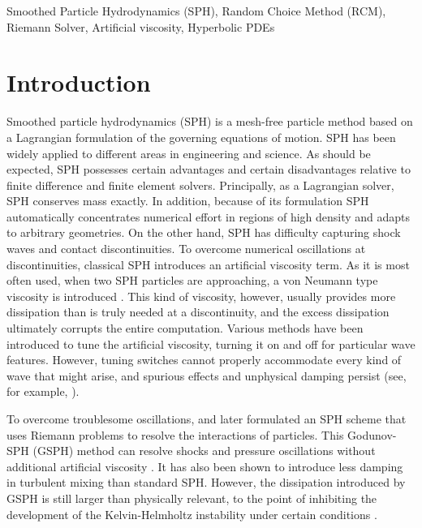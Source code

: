 \documentclass[review]{elsarticle}
\begin{document}
\begin{frontmatter}
\begin{abstract}
\end{abstract}
\begin{keyword}
Smoothed Particle Hydrodynamics (SPH), Random Choice Method (RCM), Riemann Solver, Artificial viscosity, Hyperbolic PDEs
\end{keyword}
\end{frontmatter}

\linenumbers
\section{Introduction}
Smoothed particle hydrodynamics (SPH) \citep{gingold1977smoothed,lucy1977numerical} is a mesh-free particle method based on a Lagrangian formulation of the governing equations of  motion.
SPH has been widely applied to different areas in engineering and science. As should be expected, SPH possesses certain advantages and certain disadvantages relative to finite difference and finite element solvers. Principally, as a Lagrangian solver, SPH conserves mass exactly. 
In addition, because of its formulation SPH automatically concentrates numerical effort in regions of high density and adapts to arbitrary geometries. On the other hand, 
SPH has difficulty capturing shock waves and contact discontinuities. To overcome numerical oscillations at discontinuities, classical SPH introduces an artificial viscosity term. As it is most often used, when two SPH particles are approaching, a von Neumann type viscosity is introduced
\citep{monaghan1983shock, monaghan1997sph,klapp2012strong}. 
This kind of viscosity, however, usually provides more dissipation than is truly needed at a discontinuity, and the excess dissipation ultimately corrupts the entire computation. Various methods have been introduced to tune the artificial viscosity, turning it on and off for particular wave features. However, tuning switches cannot properly accommodate every kind of wave that might arise, and spurious effects and unphysical damping persist (see, for example, \cite{borgani2012hydrodynamic,flebbe1994smoothed,morris1997switch, dolag2005turbulent,cullen2010inviscid,sigalotti2008adaptive,puri2014comparison}).
 
To overcome troublesome oscillations, \citet{inutsuka2002reformulation} and later \citet{cha2003implementations} formulated an SPH scheme that uses Riemann problems to resolve the interactions of particles. This Godunov-SPH (GSPH) method can resolve shocks and pressure oscillations without additional artificial viscosity \citep{inutsuka2002reformulation, cha2003implementations,iwasaki2011smoothed, puri2014approximate,borgani2012hydrodynamic}. It has also been shown to introduce less damping in turbulent mixing \citep{cha2010kelvin, borgani2012hydrodynamic} than standard SPH. 
However, the dissipation introduced by GSPH is still larger than physically relevant, to the point
of inhibiting the development of the Kelvin-Helmholtz instability under certain conditions \citep{borgani2012hydrodynamic}.
\end{document}

